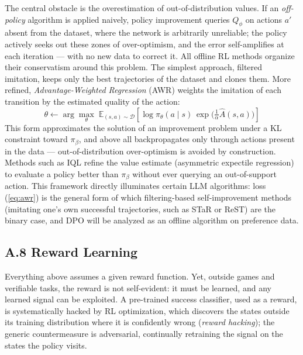 \documentclass[11pt,a4paper]{article}
\begin{document}
The central obstacle is the overestimation of out-of-distribution values. If an \emph{off-policy} algorithm is applied naively, policy improvement queries $Q_\phi$ on actions $a'$ absent from the dataset, where the network is arbitrarily unreliable; the policy actively seeks out these zones of over-optimism, and the error self-amplifies at each iteration — with no new data to correct it. All offline RL methods organize their conservatism around this problem. The simplest approach, filtered imitation, keeps only the best trajectories of the dataset and clones them. More refined, \emph{Advantage-Weighted Regression} (AWR) weights the imitation of each transition by the estimated quality of the action:
\begin{equation}
\theta \leftarrow \arg\max_\theta \; \mathbb{E}_{(s,a) \sim \mathcal{D}} \left[ \log \pi_\theta(a \mid s) \, \exp\big( \tfrac{1}{\alpha} \hat{A}(s, a) \big) \right]
\label{eq:awr}
\end{equation}
This form approximates the solution of an improvement problem under a KL constraint toward $\pi_\beta$, and above all backpropagates only through actions present in the data — out-of-distribution over-optimism is avoided by construction. Methods such as IQL refine the value estimate (asymmetric expectile regression) to evaluate a policy better than $\pi_\beta$ without ever querying an out-of-support action. This framework directly illuminates certain LLM algorithms: loss (\ref{eq:awr}) is the general form of which filtering-based self-improvement methods (imitating one's own successful trajectories, such as STaR or ReST) are the binary case, and DPO will be analyzed as an offline algorithm on preference data.

\subsection*{A.8 Reward Learning}
Everything above assumes a given reward function. Yet, outside games and verifiable tasks, the reward is not self-evident: it must be learned, and any learned signal can be exploited. A pre-trained success classifier, used as a reward, is systematically hacked by RL optimization, which discovers the states outside its training distribution where it is confidently wrong (\emph{reward hacking}); the generic countermeasure is adversarial, continually retraining the signal on the states the policy visits.
\end{document}
